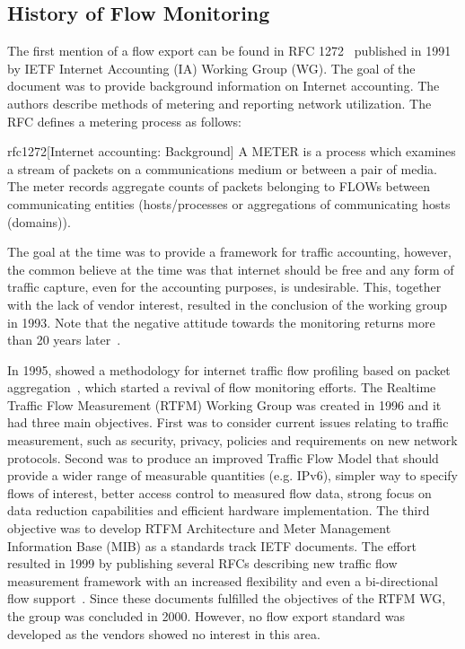 \subsection{History of Flow Monitoring}\label{subsec:history-of-flow-monitoring}

The first mention of a flow export can be found in RFC 1272~\cite{rfc1272} published in 1991 by IETF Internet Accounting (IA) Working Group (WG). The goal of the document was to provide background information on Internet accounting. The authors describe methods of metering and reporting network utilization. The RFC defines a metering process as follows:

\begin{displaycquote}{rfc1272}[Internet accounting: Background]
A METER is a process which examines a stream of packets on a communications medium or between a pair of media. The meter records  aggregate counts of packets belonging to FLOWs between communicating entities (hosts/processes or aggregations of communicating hosts (domains)).
\end{displaycquote}

The goal at the time was to provide a framework for traffic accounting, however, the common believe at the time was that internet should be free and any form of traffic capture, even for the accounting purposes, is undesirable. This, together with the lack of vendor interest, resulted in the conclusion of the working group in 1993. Note that the negative attitude towards the monitoring returns more than 20 years later~\cite{rfc7258}.

In 1995, \citeauthor{Claffy-1995-Parameterizable} showed a methodology for internet traffic flow profiling based on packet aggregation~\cite{Claffy-1995-Parameterizable}, which started a revival of flow monitoring efforts. The Realtime Traffic Flow  Measurement (RTFM) Working Group was created in 1996 and it had three main objectives. First was to consider current issues relating to traffic measurement, such as security, privacy, policies and requirements on new network protocols. Second was to produce an improved Traffic Flow Model that should provide a wider range of measurable quantities (e.g. IPv6), simpler way to specify flows of interest, better access control  to measured flow data, strong focus on data reduction capabilities and efficient hardware implementation. The third objective was to develop RTFM Architecture and Meter Management Information Base (MIB) as a standards track IETF documents. The effort resulted in 1999 by publishing several RFCs describing new traffic flow measurement framework with an increased flexibility and even a bi-directional flow support~\cite{rfc2722}. Since these documents fulfilled the objectives of the RTFM WG, the group was concluded in 2000. However, no flow export standard was developed as the vendors showed no interest in this area.

